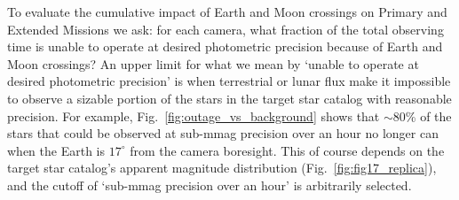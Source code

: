 To evaluate the cumulative impact of Earth and Moon crossings on \tesss 
Primary and Extended Missions we ask: for each camera, what fraction of the 
total observing time is \tess unable to operate at desired photometric 
precision because of Earth and Moon crossings?
An upper limit for what we mean by `unable to operate at desired photometric 
precision' is when terrestrial or lunar flux make it impossible to observe a sizable portion of the stars in the \tess target star catalog with reasonable precision.
For example, Fig.~\ref{fig:outage_vs_background} shows that $\sim$80\% of the stars that could be observed at sub-mmag precision over an hour no longer can when the Earth is $17^\circ$ from the camera boresight.
This of course depends on the target star catalog's apparent magnitude 
distribution (Fig.~\ref{fig:fig17_replica}), and the cutoff of `sub-mmag 
precision over an hour' is arbitrarily selected.

